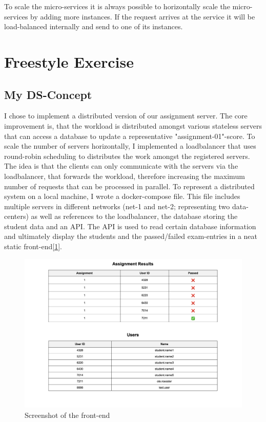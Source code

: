 \documentclass{article}
\begin{document}
To scale the micro-services it is always possible to horizontally scale the micro-services by adding more instances. If the request arrives at the service it will be load-balanced internally and send to one of its instances.


\section{Freestyle Exercise}
\subsection{My DS-Concept}
I chose to implement a distributed version of our assignment server. 
The core improvement is, that the workload is distributed amongst various stateless servers that can access a database to update a representative "assignment-01"-score. To scale the number of servers horizontally, I implemented a loadbalancer that uses round-robin scheduling to distributes the work amongst the registered servers. The idea is that the clients can only communicate with the servers via the loadbalancer, that forwards the workload, therefore increasing the maximum number of requests that can be processed in parallel. 
To represent a distributed system on a local machine, I wrote a docker-compose file. This file includes multiple servers in different networks (net-1 and net-2; representing two data-centers) as well as references to the loadbalancer, the database storing the student data and an API. The API is used to read certain database information and ultimately display the students and the passed/failed exam-entries in a neat static front-end[\ref{fig:frontend}].

\begin{figure}[!hb]
    \centering
    \includegraphics[width=1\linewidth]{images/frontend_screenshot.png}
    \caption{Screenshot of the front-end}
    \label{fig:frontend}
\end{figure}
\end{document}
